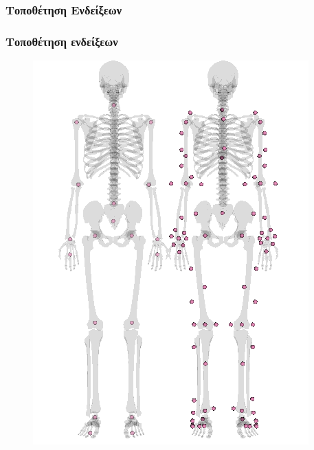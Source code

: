 \documentclass[8pt,sans,mathserif,aspectratio=43]{beamer}%
\begin{document}
\subsubsection{Τοποθέτηση Ενδείξεων}
\begin{frame}
\frametitle{Τοποθέτηση ενδείξεων}
    
    \begin{figure}[t]
        \includegraphics[height=0.9\textheight, keepaspectratio]{fig/kinect-vicon-markers.png}
    \end{figure}
    
\end{frame}
\end{document}
